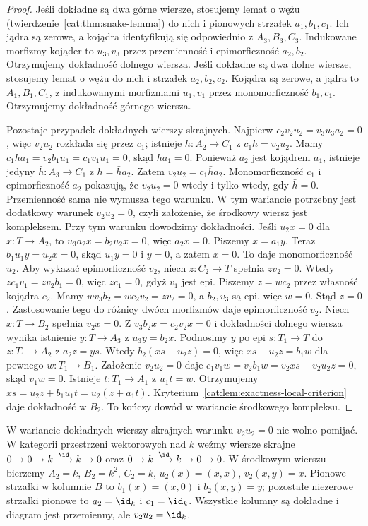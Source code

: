 \begin{proof}
Jeśli dokładne są dwa górne wiersze, stosujemy lemat o wężu (twierdzenie~\ref{cat:thm:snake-lemma}) do nich i pionowych strzałek $a_1,b_1,c_1$. Ich jądra są zerowe, a kojądra identyfikują się odpowiednio z $A_3,B_3,C_3$. Indukowane morfizmy kojąder to $u_3,v_3$ przez przemienność i epimorficzność $a_2,b_2$. Otrzymujemy dokładność dolnego wiersza. Jeśli dokładne są dwa dolne wiersze, stosujemy lemat o wężu do nich i strzałek $a_2,b_2,c_2$. Kojądra są zerowe, a jądra to $A_1,B_1,C_1$, z indukowanymi morfizmami $u_1,v_1$ przez monomorficzność $b_1,c_1$. Otrzymujemy dokładność górnego wiersza.

Pozostaje przypadek dokładnych wierszy skrajnych. Najpierw $c_2v_2u_2=v_3u_3a_2=0$, więc $v_2u_2$ rozkłada się przez $c_1$; istnieje $h:A_2\to C_1$ z $c_1h=v_2u_2$. Mamy $c_1ha_1=v_2b_1u_1=c_1v_1u_1=0$, skąd $ha_1=0$. Ponieważ $a_2$ jest kojądrem $a_1$, istnieje jedyny $\bar h:A_3\to C_1$ z $h=\bar h a_2$. Zatem $v_2u_2=c_1\bar h a_2$. Monomorficzność $c_1$ i epimorficzność $a_2$ pokazują, że $v_2u_2=0$ wtedy i tylko wtedy, gdy $\bar h=0$. Przemienność sama nie wymusza tego warunku. W tym wariancie potrzebny jest dodatkowy warunek $v_2u_2=0$, czyli założenie, że środkowy wiersz jest kompleksem.
Przy tym warunku dowodzimy dokładności. Jeśli $u_2x=0$ dla $x:T\to A_2$, to $u_3a_2x=b_2u_2x=0$, więc $a_2x=0$. Piszemy $x=a_1y$. Teraz $b_1u_1y=u_2x=0$, skąd $u_1y=0$ i $y=0$, a zatem $x=0$. To daje monomorficzność $u_2$. Aby wykazać epimorficzność $v_2$, niech $z:C_2\to T$ spełnia $zv_2=0$. Wtedy $zc_1v_1=zv_2b_1=0$, więc $zc_1=0$, gdyż $v_1$ jest epi. Piszemy $z=wc_2$ przez własność kojądra $c_2$. Mamy $wv_3b_2=wc_2v_2=zv_2=0$, a $b_2,v_3$ są epi, więc $w=0$. Stąd $z=0$. Zastosowanie tego do różnicy dwóch morfizmów daje epimorficzność $v_2$.
Niech $x:T\to B_2$ spełnia $v_2x=0$. Z $v_3b_2x=c_2v_2x=0$ i dokładności dolnego wiersza wynika istnienie $y:T\to A_3$ z $u_3y=b_2x$. Podnosimy $y$ po epi $s:T_1\to T$ do $z:T_1\to A_2$ z $a_2z=ys$. Wtedy $b_2(xs-u_2z)=0$, więc $xs-u_2z=b_1w$ dla pewnego $w:T_1\to B_1$. Założenie $v_2u_2=0$ daje
$c_1v_1w=v_2b_1w=v_2xs-v_2u_2z=0$,
skąd $v_1w=0$. Istnieje $t:T_1\to A_1$ z $u_1t=w$. Otrzymujemy
$xs=u_2z+b_1u_1t=u_2(z+a_1t)$.
Kryterium~\ref{cat:lem:exactness-local-criterion} daje dokładność w $B_2$. To kończy dowód w wariancie środkowego kompleksu.
\end{proof}
\begin{uwaga}\label{cat:rem:nine-lemma-complex}
W wariancie dokładnych wierszy skrajnych warunku $v_2u_2=0$ nie wolno pomijać. W kategorii przestrzeni wektorowych nad $k$ weźmy wiersze skrajne $0\to0\to k\xrightarrow{\id}k\to0$ oraz $0\to k\xrightarrow{\id}k\to0\to0$. W środkowym wierszu bierzemy $A_2=k$, $B_2=k^2$, $C_2=k$, $u_2(x)=(x,x)$, $v_2(x,y)=x$. Pionowe strzałki w kolumnie $B$ to $b_1(x)=(x,0)$ i $b_2(x,y)=y$; pozostałe niezerowe strzałki pionowe to $a_2=\id_k$ i $c_1=\id_k$. Wszystkie kolumny są dokładne i diagram jest przemienny, ale $v_2u_2=\id_k$.
\end{uwaga}
